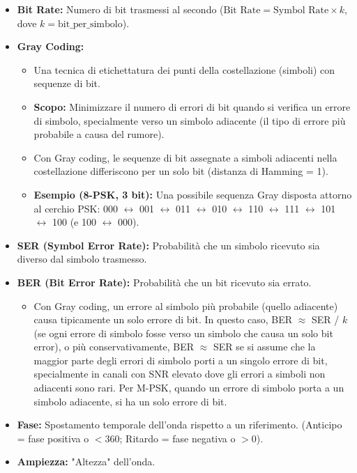 \begin{itemize}
    \item \textbf{Bit Rate:} Numero di bit trasmessi al secondo ($\text{Bit Rate} = \text{Symbol Rate} \times k$, dove $k = \text{bit\_per\_simbolo}$).
    \item \textbf{Gray Coding:}
    \begin{itemize}
        \item Una tecnica di etichettatura dei punti della costellazione (simboli) con sequenze di bit.
        \item \textbf{Scopo:} Minimizzare il numero di errori di bit quando si verifica un errore di simbolo, specialmente verso un simbolo adiacente (il tipo di errore più probabile a causa del rumore).
        \item Con Gray coding, le sequenze di bit assegnate a simboli adiacenti nella costellazione differiscono per un solo bit (distanza di Hamming = 1).
        \item \textbf{Esempio (8-PSK, 3 bit):} Una possibile sequenza Gray disposta attorno al cerchio PSK: 000 $\leftrightarrow$ 001 $\leftrightarrow$ 011 $\leftrightarrow$ 010 $\leftrightarrow$ 110 $\leftrightarrow$ 111 $\leftrightarrow$ 101 $\leftrightarrow$ 100 (e 100 $\leftrightarrow$ 000).
    \end{itemize}
    \item \textbf{SER (Symbol Error Rate):} Probabilità che un simbolo ricevuto sia diverso dal simbolo trasmesso.
    \item \textbf{BER (Bit Error Rate):} Probabilità che un bit ricevuto sia errato.
    \begin{itemize}
        \item Con Gray coding, un errore al simbolo più probabile (quello adiacente) causa tipicamente un solo errore di bit. In questo caso, BER $\approx$ SER / $k$ (se ogni errore di simbolo fosse verso un simbolo che causa un solo bit error), o più conservativamente, BER $\approx$ SER se si assume che la maggior parte degli errori di simbolo porti a un singolo errore di bit, specialmente in canali con SNR elevato dove gli errori a simboli non adiacenti sono rari. Per M-PSK, quando un errore di simbolo porta a un simbolo adiacente, si ha un solo errore di bit.
    \end{itemize}
    \item \textbf{Fase:} Spostamento temporale dell'onda rispetto a un riferimento. (Anticipo = fase positiva o $<$360\textdegree; Ritardo = fase negativa o $>$0\textdegree).
    \item \textbf{Ampiezza:} "Altezza" dell'onda.
\end{itemize}

